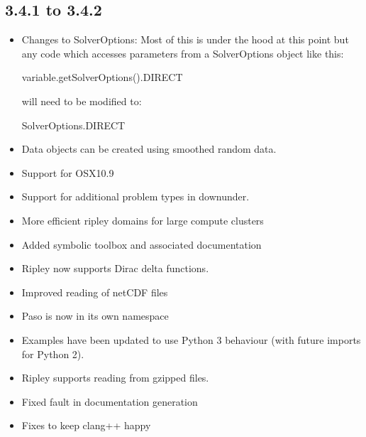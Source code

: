 \subsection*{3.4.1 to 3.4.2}
\begin{itemize}
 \item Changes to SolverOptions: Most of this is under the hood at this point
  but any code which accesses parameters from a SolverOptions object like this:
 \begin{python}
   variable.getSolverOptions().DIRECT
 \end{python}
 will need to be modified to:
 \begin{python}
   SolverOptions.DIRECT
 \end{python}

 \item Data objects can be created using smoothed random data.
 \item Support for OSX10.9
 \item Support for additional problem types in downunder.
 \item More efficient ripley domains for large compute clusters
 \item Added symbolic toolbox and associated documentation
 \item Ripley now supports Dirac delta functions.
 \item Improved reading of netCDF files
 \item Paso is now in its own namespace
 \item Examples have been updated to use Python 3 behaviour (with future imports for Python 2).
 \item Ripley supports reading from gzipped files.
 \item Fixed fault in documentation generation
 \item Fixes to keep clang++ happy
\end{itemize}


